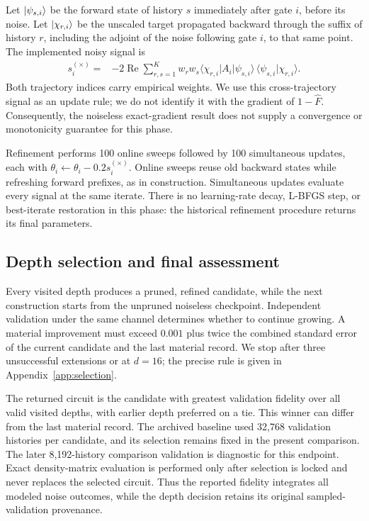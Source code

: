 Let $\ket{\psi_{s,i}}$ be the forward state of history $s$ immediately after gate $i$, before its noise. Let $\ket{\chi_{r,i}}$ be the unscaled target propagated backward through the suffix of history $r$, including the adjoint of the noise following gate $i$, to that same point. The implemented noisy signal is
\begin{equation}
\begin{split}
    s_i^{(\times)}={}&-2\operatorname{Re}
    \sum_{r,s=1}^{K}w_rw_s
    \langle\chi_{r,i}|A_i|\psi_{s,i}\rangle\,
    \langle\psi_{s,i}|\chi_{r,i}\rangle.
\end{split}
    \label{eq:cross_signal}
\end{equation}
Both trajectory indices carry empirical weights. We use this cross-trajectory signal as an update rule; we do not identify it with the gradient of $1-\widehat F$. Consequently, the noiseless exact-gradient result does not supply a convergence or monotonicity guarantee for this phase.

Refinement performs 100 online sweeps followed by 100 simultaneous updates, each with $\theta_i\leftarrow\theta_i-0.2s_i^{(\times)}$. Online sweeps reuse old backward states while refreshing forward prefixes, as in construction. Simultaneous updates evaluate every signal at the same iterate. There is no learning-rate decay, L-BFGS step, or best-iterate restoration in this phase: the historical refinement procedure returns its final parameters.

\subsection{Depth selection and final assessment}
\label{sec:depth_selection}

Every visited depth produces a pruned, refined candidate, while the next construction starts from the unpruned noiseless checkpoint. Independent validation under the same channel determines whether to continue growing. A material improvement must exceed $0.001$ plus twice the combined standard error of the current candidate and the last material record. We stop after three unsuccessful extensions or at $d=16$; the precise rule is given in Appendix~\ref{app:selection}.

The returned circuit is the candidate with greatest validation fidelity over all valid visited depths, with earlier depth preferred on a tie. This winner can differ from the last material record. The archived baseline used 32,768 validation histories per candidate, and its selection remains fixed in the present comparison. The later 8,192-history comparison validation is diagnostic for this endpoint. Exact density-matrix evaluation is performed only after selection is locked and never replaces the selected circuit. Thus the reported fidelity integrates all modeled noise outcomes, while the depth decision retains its original sampled-validation provenance.
